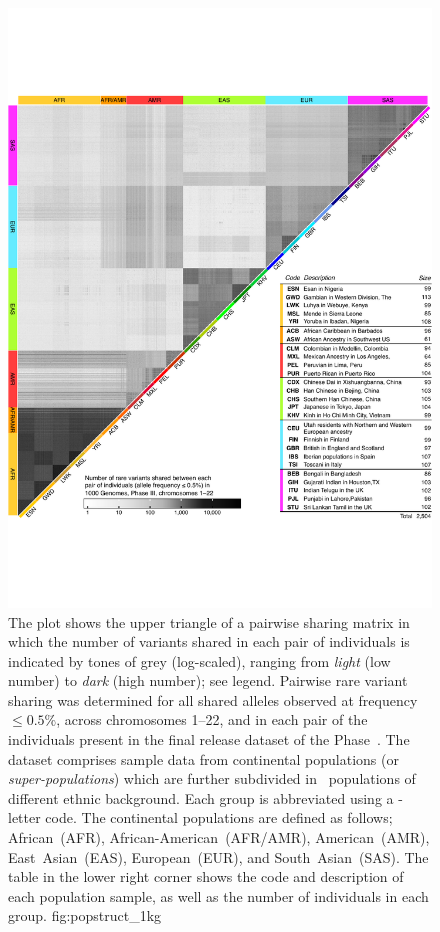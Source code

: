 

\begin{figure}[p]
\includegraphics[width=\textwidth]{./img/ch3/popstruct_1kg}
{The plot shows the upper triangle of a pairwise sharing matrix in which the number of variants shared in each pair of individuals is indicated by tones of grey (log-scaled), ranging from \emph{light} (low number) to \emph{dark} (high number); see legend.
Pairwise rare variant sharing was determined for all shared alleles observed at  frequency ${\leq 0.5\%}$, across chromosomes 1--22, and in each pair of the  individuals present in the final release dataset of the  Phase~.
The dataset comprises sample data from  continental populations (or \emph{super-populations}) which are further subdivided in ~populations of different ethnic background.
Each group is abbreviated using a -letter code.
The  continental populations are defined as follows;
African~(AFR), African-American~(AFR/AMR), American~(AMR), East~Asian~(EAS), European~(EUR), and South~Asian~(SAS).
The table in the lower right corner shows the code and description of each  population sample, as well as the number of individuals in each group.}
{fig:popstruct_1kg}
\end{figure}

